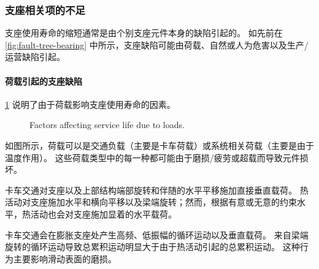 \subsubsection{支座相关项的不足}
支座使用寿命的缩短通常是由个别支座元件本身的缺陷引起的。 如先前在 \cref{fig:fault-tree-bearing} 中所示，支座缺陷可能由荷载、自然或人为危害以及生产/运营缺陷引起。

\paragraph{荷载引起的支座缺陷}
\cref{fig:faulttree-bearing-load} 说明了由于荷载影响支座使用寿命的因素。

\begin{figure}
  \caption{Factors affecting service life due to loads.}
  \label{fig:faulttree-bearing-load}
\end{figure}

如图所示，荷载可以是交通负载（主要是卡车荷载）或系统相关荷载（主要是由于温度作用）。 这些荷载类型中的每一种都可能由于磨损/疲劳或超载而导致元件损坏。

卡车交通对支座以及上部结构端部旋转和伴随的水平平移施加直接垂直载荷。 热活动对支座施加水平和横向平移以及梁端旋转；然而，根据有意或无意的约束水平，热活动也会对支座施加显着的水平载荷。

卡车交通会在膨胀支座处产生高频、低振幅的循环运动以及垂直载荷。 来自梁端旋转的循环运动导致总累积运动明显大于由于热活动引起的总累积运动。 这种行为主要影响滑动表面的磨损。

